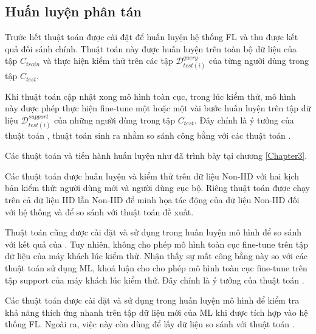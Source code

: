\subsection{Huấn luyện phân tán}

Trước hết thuật toán  được cài đặt để huấn luyện hệ thống FL và thu được kết quả đối sánh chính. Thuật toán này được huấn luyện trên toàn bộ dữ liệu của tập $C_{train}$ và thực hiện kiểm thử trên các tập $\mathcal{D}_{test(i)}^{query}$ của từng người dùng trong tập $C_{test}$.

Khi thuật toán  cập nhật xong mô hình toàn cục, trong lúc kiểm thử, mô hình này được phép thực hiện fine-tune một hoặc một vài bước huấn luyện trên tập dữ liệu $\mathcal{D}_{test(i)}^{support}$ của những người dùng trong tập $C_{test}$. Đây chính là ý tưởng của thuật toán , thuật toán sinh ra nhằm so sánh công bằng với các thuật toán .

Các thuật toán  và  tiến hành huấn luyện như đã trình bày tại chương \ref{Chapter3}.


Các thuật toán được huấn luyện và kiểm thử trên dữ liệu Non-IID với hai kịch bản kiểm thử: người dùng mới và người dùng cục bộ. Riêng thuật toán  được chạy trên cả dữ liệu IID lẫn Non-IID để minh họa tác động của dữ liệu Non-IID đối với hệ thống và để so sánh với thuật toán đề xuất.

Thuật toán  cũng được cài đặt và sử dụng trong huấn luyện mô hình để so sánh với kết quả của . Tuy nhiên,  không cho phép mô hình toàn cục fine-tune trên tập dữ liệu của máy khách lúc kiểm thử. Nhận thấy sự mất công bằng này so với các thuật toán sử dụng ML, khoá luận cho cho phép mô hình toàn cục fine-tune trên tập support của máy khách lúc kiểm thử. Đây chính là ý tưởng của thuật toán .

Các thuật toán  được cài đặt và sử dụng trong huấn luyện mô hình để kiểm tra khả năng thích ứng nhanh trên tập dữ liệu mới của ML khi được tích hợp vào hệ thống FL. Ngoài ra, việc này còn dùng để lấy dữ liệu so sánh với thuật toán .

